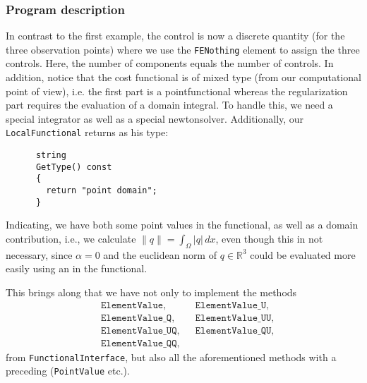 \subsubsection{Program description}
{
In contrast to the first example, the control is now a discrete quantity (for
the three observation points) where we use the \texttt{FE\underline{}Nothing}
element to assign the three controls. Here, the number of components equals
the number of controls. 
In addition, }notice that the cost functional is of mixed type (from our computational point of view), i.e. the first part is a pointfunctional whereas the regularization part requires the evaluation of a domain integral. To handle this, we need a special integrator as well as a special newtonsolver. Additionally, our \texttt{LocalFunctional} returns as his type:
\begin{verbatim}
      string
      GetType() const
      {
        return "point domain";
      }
\end{verbatim}
Indicating, we have both some point values in the functional, as well as a domain contribution, 
i.e., we calculate $\|q\| = \int_\Omega |q|\,dx$,
even though this in not necessary, since $\alpha =0$ and the euclidean 
norm of $q\in \mathbb R^3$ could be evaluated more easily using an  in the functional.
  
This brings along that we have not only to implement {the methods
\begin{align*} 
 &\texttt{ElementValue},&&
 \texttt{ElementValue\_U},\\
 &\texttt{ElementValue\_Q}, &&
 \texttt{ElementValue\_UU},\\
 &\texttt{ElementValue\_UQ},&&
 \texttt{ElementValue\_QU},\\
 &\texttt{ElementValue\_QQ},
\end{align*}}
 from \texttt{FunctionalInterface}, but also all the aforementioned methods with a preceding  (\texttt{PointValue} etc.).

